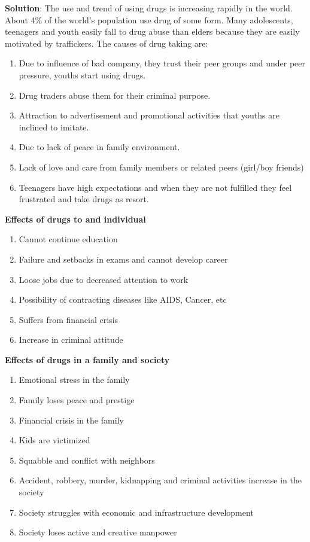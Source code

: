 \documentclass[
]{book}
\newenvironment{solution}{ {\bfseries Solution}:}{}
\begin{document}
\begin{questions}
\begin{solution}
The use and trend of using drugs is increasing rapidly in the world. About 4\% of the world's population use drug of some form. Many adolescents, teenagers and youth easily fall to drug abuse than elders because they are easily motivated by traffickers. The causes of drug taking are:
\begin{enumerate}
\item Due to influence of bad company, they trust their peer groups and under peer pressure, youths start using drugs.
\item Drug traders abuse them for their criminal purpose.
\item Attraction to advertisement and promotional activities that youths are inclined to imitate.
\item Due to lack of peace in family environment.
\item Lack of love and care from family members or related peers (girl/boy friends)
\item Teenagers have high expectations and when they are not fulfilled they feel frustrated and take drugs as resort.
\end{enumerate}

\textbf{Effects of drugs to and individual}
\begin{enumerate}
\item Cannot continue education
\item Failure and setbacks in exams and cannot develop career
\item Loose jobs due to decreased attention to work
\item Possibility of contracting diseases like AIDS, Cancer, etc
\item Suffers from financial crisis
\item Increase in criminal attitude
\end{enumerate}

\textbf{Effects of drugs in a family and society}
\begin{enumerate}
\item Emotional stress in the family
\item Family loses peace and prestige
\item Financial crisis in the family
\item Kids are victimized
\item Squabble and conflict with neighbors
\item Accident, robbery, murder, kidnapping and criminal activities increase in the society
\item Society struggles with economic and infrastructure development
\item Society loses active and creative manpower
\end{enumerate}


\end{solution}
\end{questions}
\end{document}

